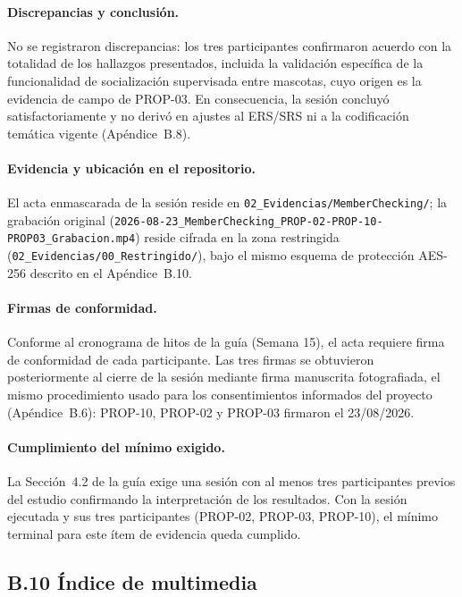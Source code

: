 \documentclass[journal,onecolumn]{IEEEtran}
\begin{document}
	\paragraph{Discrepancias y conclusión.}
	No se registraron discrepancias: los tres participantes confirmaron
	acuerdo con la totalidad de los hallazgos presentados, incluida la
	validación específica de la funcionalidad de socialización supervisada
	entre mascotas, cuyo origen es la evidencia de campo de PROP-03. En
	consecuencia, la sesión concluyó satisfactoriamente y no derivó en
	ajustes al ERS/SRS ni a la codificación temática vigente (Apéndice~B.8).

	\paragraph{Evidencia y ubicación en el repositorio.}
	El acta enmascarada de la sesión reside en
	\texttt{02\_Evidencias/MemberChecking/}; la grabación original
	(\texttt{2026-08-23\_MemberChecking\_PROP-02-PROP-10-PROP03\_Grabacion.mp4})
	reside cifrada en la zona restringida
	(\texttt{02\_Evidencias/00\_Restringido/}), bajo el mismo esquema de
	protección AES-256 descrito en el Apéndice~B.10.

	\paragraph{Firmas de conformidad.}
	Conforme al cronograma de hitos de la guía (Semana 15), el acta requiere
	firma de conformidad de cada participante. Las tres firmas se obtuvieron
	posteriormente al cierre de la sesión mediante firma manuscrita
	fotografiada, el mismo procedimiento usado para los consentimientos
	informados del proyecto (Apéndice~B.6): PROP-10, PROP-02 y PROP-03
	firmaron el 23/08/2026.

	\paragraph{Cumplimiento del mínimo exigido.}
	La Sección~4.2 de la guía exige una sesión con al menos tres
	participantes previos del estudio confirmando la interpretación de los
	resultados. Con la sesión ejecutada y sus tres participantes (PROP-02,
	PROP-03, PROP-10), el mínimo terminal para este ítem de evidencia queda
	cumplido.

	\subsection*{B.10 Índice de multimedia}
	
\end{document}
